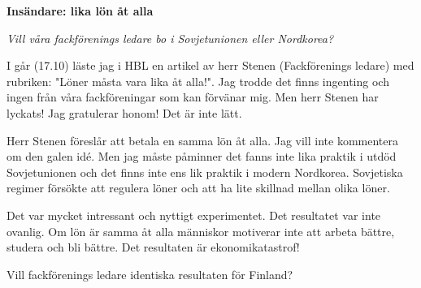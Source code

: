 \documentclass[12pt]{letter}
\begin{document}
\signature{Vitaly Repin, ingenör, Esbo}
\address{HBL:s redaktion\\ Mannerheimvägen 18\\ Helsingfors\\ Finland}

\begin{letter}{\bf Insändare: lika lön åt alla}
\opening{\textit{Vill våra fackförenings ledare bo i Sovjetunionen eller Nordkorea?}}

I går (17.10) läste jag i HBL en artikel av herr Stenen (Fackförenings ledare) med rubriken: "Löner måsta vara lika åt alla!". Jag trodde det finns ingenting och ingen från våra fackföreningar som kan förvänar mig. Men herr Stenen har lyckats!  Jag gratulerar honom! Det är inte lätt.

Herr Stenen föreslår att betala en samma lön åt alla. Jag vill inte kommentera om den galen idé. Men jag måste påminner det fanns inte lika praktik i utdöd Sovjetunionen och det finns inte ens lik praktik i modern Nordkorea. Sovjetiska regimer försökte att regulera löner och att ha lite skillnad mellan olika löner.

Det var mycket intressant och nyttigt experimentet.  Det resultatet var inte ovanlig. Om lön är samma åt alla människor motiverar inte att arbeta bättre, studera och bli bättre. Det resultaten är ekonomikatastrof!

Vill fackförenings ledare identiska resultaten för Finland?

\closing{\hspace{1cm}}

\end{letter}
\end{document}
